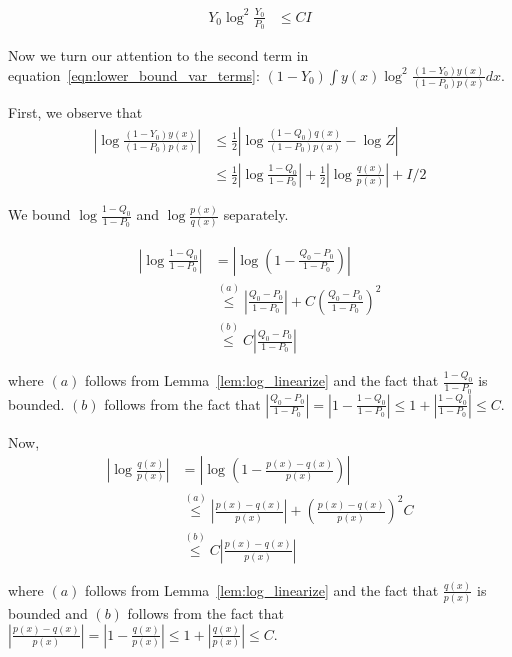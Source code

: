 \documentclass{article}
\begin{document}
\begin{align}
Y_0 \log^2 \frac{Y_0}{P_0} & \leq C I \label{eqn:lower_bound_var_term_1}
\end{align}      

Now we turn our attention to the second term in equation~\ref{eqn:lower_bound_var_terms}:  $(1-Y_0) \int y(x) \log^2 \frac{(1-Y_0) y(x)}{(1-P_0)p(x)} dx $.

First, we observe that
\begin{align*}
\left| \log \frac{(1-Y_0) y(x)}{(1-P_0)p(x)} \right| &\leq 
              \frac{1}{2} \left| \log \frac{ (1-Q_0) q(x)}{(1-P_0)p(x)} - \log Z \right| \\
%
    &\leq \frac{1}{2} \left| \log \frac{1 - Q_0}{1-P_0} \right| + 
               \frac{1}{2} \left| \log \frac{q(x)}{p(x)} \right| + I/2 
\end{align*}

We bound $\log \frac{1- Q_0}{1-P_0}$ and $\log \frac{p(x)}{q(x)}$ separately. 

\begin{align*}
\left| \log \frac{1 - Q_0}{1- P_0} \right| &= \left| \log \left( 1 - \frac{Q_0 - P_0}{1 - P_0} \right) \right|\\ 
  &\stackrel{(a)} \leq \left| \frac{Q_0 - P_0}{1 - P_0} \right| + C \left( \frac{Q_0 - P_0}{1 - P_0} \right)^2 \\
  &\stackrel{(b)} \leq C \left| \frac{Q_0 - P_0}{1 - P_0} \right|
\end{align*}

where $(a)$ follows from Lemma~\ref{lem:log_linearize} and the fact that $\frac{1 - Q_0}{1 - P_0}$ is bounded. $(b)$ follows from the fact that $\left| \frac{Q_0 - P_0}{1 - P_0} \right| = \left| 1 - \frac{1 - Q_0}{1 - P_0} \right| \leq 1 + \left| \frac{1 - Q_0}{1 - P_0} \right| \leq C$.

Now,
\begin{align*}
\left| \log \frac{q(x)}{p(x)} \right| &= \left| \log \left( 1 - \frac{p(x) - q(x)}{p(x)} \right) \right| \\
    &\stackrel{(a)} \leq \left| \frac{p(x) - q(x)}{p(x)} \right| + \left( \frac{p(x) - q(x)}{p(x)} \right)^2 C \\
  &\stackrel{(b)} \leq C \left| \frac{p(x) - q(x)}{p(x)} \right|
\end{align*}

where $(a)$ follows from Lemma~\ref{lem:log_linearize} and the fact that $\frac{q(x)}{p(x)}$ is bounded and $(b)$ follows from the fact that $\left| \frac{p(x) - q(x)}{p(x)} \right| = \left| 1 - \frac{q(x)}{p(x)} \right| \leq 1 + \left| \frac{q(x)}{p(x)} \right| \leq C$. 
\end{document}
